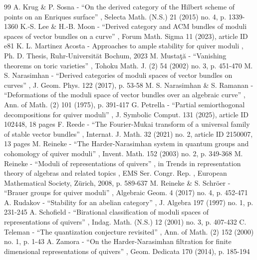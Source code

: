\documentclass[11pt]{article}
\theoremstyle{plain}
\theoremstyle{definition}
\begin{document}
\begin{thebibliography}{99}
 A. Krug \& P. Sosna - “On the derived category of the Hilbert scheme of points on an Enriques surface” , Selecta Math. (N.S.) 21 (2015) no. 4, p. 1339-1360
 K.-S. Lee \& H.-B. Moon - “Derived category and ACM bundles of moduli spaces of vector bundles on a curve” , Forum Math. Sigma 11 (2023), article ID e81
 K. L. Martinez Acosta - Approaches to ample stability for quiver moduli , Ph. D. Thesis, Ruhr-Universität Bochum, 2023
 M. Mustaţă - “Vanishing theorems on toric varieties” , Tohoku Math. J. (2) 54 (2002) no. 3, p. 451-470
 M. S. Narasimhan - “Derived categories of moduli spaces of vector bundles on curves” , J. Geom. Phys. 122 (2017), p. 53-58
 M. S. Narasimhan \& S. Ramanan - “Deformations of the moduli space of vector bundles over an algebraic curve” , Ann. of Math. (2) 101 (1975), p. 391-417
 G. Petrella - “Partial semiorthogonal decompositions for quiver moduli” , J. Symbolic Comput. 131 (2025), article ID 102448, 18 pages
 F. Reede - “The Fourier-Mukai transform of a universal family of stable vector bundles” , Internat. J. Math. 32 (2021) no. 2, article ID 2150007, 13 pages
 M. Reineke - “The Harder-Narasimhan system in quantum groups and cohomology of quiver moduli” , Invent. Math. 152 (2003) no. 2, p. 349-368
 M. Reineke - “Moduli of representations of quivers” , in Trends in representation theory of algebras and related topics , EMS Ser. Congr. Rep. , European Mathematical Society, Zürich, 2008, p. 589-637
 M. Reineke \& S. Schröer - “Brauer groups for quiver moduli” , Algebraic Geom. 4 (2017) no. 4, p. 452-471
 A. Rudakov - “Stability for an abelian category” , J. Algebra 197 (1997) no. 1, p. 231-245
 A. Schofield - “Birational classification of moduli spaces of representations of quivers” , Indag. Math. (N.S.) 12 (2001) no. 3, p. 407-432
 C. Teleman - “The quantization conjecture revisited” , Ann. of Math. (2) 152 (2000) no. 1, p. 1-43
 A. Zamora - “On the Harder-Narasimhan filtration for finite dimensional representations of quivers” , Geom. Dedicata 170 (2014), p. 185-194
\end{thebibliography}
\end{document}
